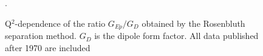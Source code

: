 \begin{figure}
\begin{center}
\caption{Q$^2$-dependence of the ratio $G_{Ep}/G_D$ obtained by the Rosenbluth separation method. $G_D$ is the dipole form factor. All data published after 1970 \cite{litt} are included}.
\label{fig:gepgd_cs}
\end{center}
\end{figure}

